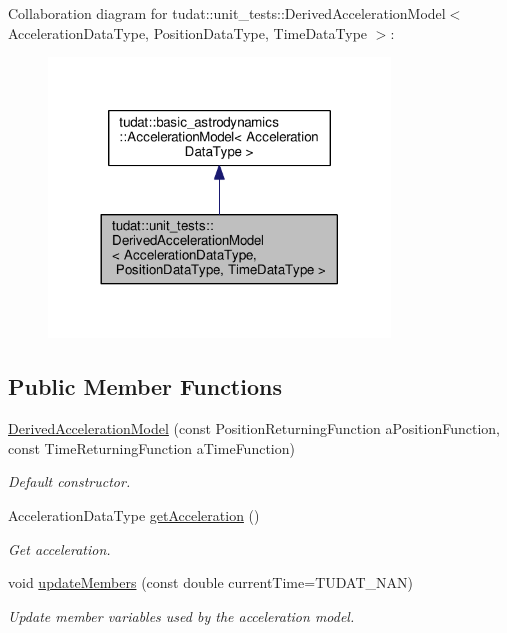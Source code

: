 Collaboration diagram for tudat\+:\+:unit\+\_\+tests\+:\+:Derived\+Acceleration\+Model$<$ Acceleration\+Data\+Type, Position\+Data\+Type, Time\+Data\+Type $>$\+:
\nopagebreak
\begin{figure}[H]
\begin{center}
\leavevmode
\includegraphics[width=257pt]{classtudat_1_1unit__tests_1_1DerivedAccelerationModel__coll__graph}
\end{center}
\end{figure}
\subsection*{Public Member Functions}
\begin{DoxyCompactItemize}
\item 
\hyperlink{classtudat_1_1unit__tests_1_1DerivedAccelerationModel_a3166b0d93f5259915d997f7ebed3c4c8}{Derived\+Acceleration\+Model} (const Position\+Returning\+Function a\+Position\+Function, const Time\+Returning\+Function a\+Time\+Function)
\begin{DoxyCompactList}\small\item\em Default constructor. \end{DoxyCompactList}\item 
Acceleration\+Data\+Type \hyperlink{classtudat_1_1unit__tests_1_1DerivedAccelerationModel_a18a9f073e9f83d021d94b9df8144d253}{get\+Acceleration} ()
\begin{DoxyCompactList}\small\item\em Get acceleration. \end{DoxyCompactList}\item 
void \hyperlink{classtudat_1_1unit__tests_1_1DerivedAccelerationModel_ae0f1908a1c80dfafc01e4c11e69e1373}{update\+Members} (const double current\+Time=T\+U\+D\+A\+T\+\_\+\+N\+AN)
\begin{DoxyCompactList}\small\item\em Update member variables used by the acceleration model. \end{DoxyCompactList}\end{DoxyCompactItemize}
